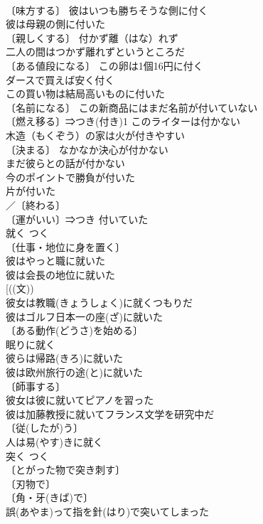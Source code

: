\documentclass[8pt]{extreport}
\begin{document}
\begin{CJK}{UTF8}{min}
\\	〔味方する〕 彼はいつも勝ちそうな側に付く 
\\	彼は母親の側に付いた 
\\	〔親しくする〕 付かず離（はな）れず　
\\	二人の間はつかず離れずというところだ 
\\	〔ある値段になる〕 この卵は1個16円に付く 
\\	ダースで買えば安く付く 
\\	この買い物は結局高いものに付いた 
\\	〔名前になる〕 この新商品にはまだ名前が付いていない 
\\	〔燃え移る〕⇒つき(付き)1 このライターは付かない 
\\	木造（もくぞう）の家は火が付きやすい 
\\	〔決まる〕 なかなか決心が付かない 
\\	まだ彼らとの話が付かない 
\\	今のポイントで勝負が付いた 
\\	片が付いた 
\\	／〔終わる〕
\\	〔運がいい〕⇒つき 付いていた 
\\	就く	つく	
\\	〔仕事・地位に身を置く〕 
\\	彼はやっと職に就いた 
\\	彼は会長の地位に就いた 
\\	[((文))
\\	彼女は教職(きょうしょく)に就くつもりだ 
\\	彼はゴルフ日本一の座(ざ)に就いた 
\\	〔ある動作(どうさ)を始める〕　
\\	眠りに就く 
\\	彼らは帰路(きろ)に就いた 
\\	彼は欧州旅行の途(と)に就いた 
\\	〔師事する〕 
\\	彼女は彼に就いてピアノを習った 
\\	彼は加藤教授に就いてフランス文学を研究中だ 
\\	〔従(したが)う〕
\\	人は易(やす)きに就く 
\\	突く	つく	
\\	〔とがった物で突き刺す〕
\\	〔刃物で〕
\\	〔角・牙(きば)で〕
\\	誤(あやま)って指を針(はり)で突いてしまった 

\end{CJK}
\end{document}
